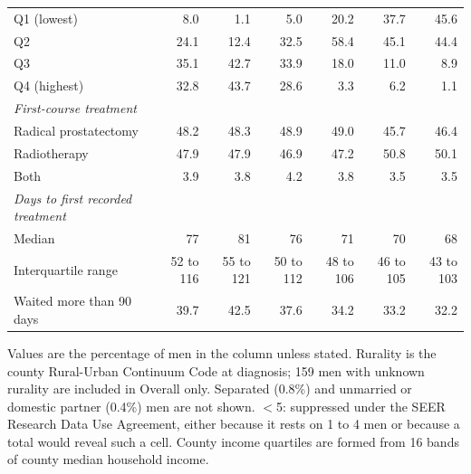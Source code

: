 \begin{table}[tbp]
\begin{tabular}{@{}l*{6}{r}@{}}
\quad Q1 (lowest) & 8.0 & 1.1 & 5.0 & 20.2 & 37.7 & 45.6 \\
\quad Q2 & 24.1 & 12.4 & 32.5 & 58.4 & 45.1 & 44.4 \\
\quad Q3 & 35.1 & 42.7 & 33.9 & 18.0 & 11.0 & 8.9 \\
\quad Q4 (highest) & 32.8 & 43.7 & 28.6 & 3.3 & 6.2 & 1.1 \\
\textit{First-course treatment} &  &  &  &  &  &  \\
\quad Radical prostatectomy & 48.2 & 48.3 & 48.9 & 49.0 & 45.7 & 46.4 \\
\quad Radiotherapy & 47.9 & 47.9 & 46.9 & 47.2 & 50.8 & 50.1 \\
\quad Both & 3.9 & 3.8 & 4.2 & 3.8 & 3.5 & 3.5 \\
\textit{Days to first recorded treatment} &  &  &  &  &  &  \\
\quad Median & 77 & 81 & 76 & 71 & 70 & 68 \\
\quad Interquartile range & 52 to 116 & 55 to 121 & 50 to 112 & 48 to 106 & 46 to 105 & 43 to 103 \\
Waited more than 90 days & 39.7 & 42.5 & 37.6 & 34.2 & 33.2 & 32.2 \\
\bottomrule
\end{tabular}
\par\smallskip
\begin{minipage}{\linewidth}\scriptsize Values are the percentage of men in the column unless stated. Rurality is the county Rural-Urban Continuum Code at diagnosis; 159 men with unknown rurality are included in Overall only. Separated (0.8\%) and unmarried or domestic partner (0.4\%) men are not shown. $<$5: suppressed under the SEER Research Data Use Agreement, either because it rests on 1 to 4 men or because a total would reveal such a cell. County income quartiles are formed from 16 bands of county median household income.\end{minipage}
\end{table}
